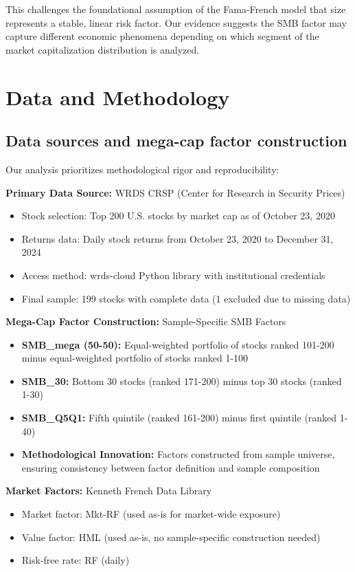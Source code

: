 \documentclass[10pt,letterpaper]{article}
\begin{document}
This challenges the foundational assumption of the Fama-French model that size represents a stable, linear risk factor. Our evidence suggests the SMB factor may capture different economic phenomena depending on which segment of the market capitalization distribution is analyzed.

\section*{Data and Methodology}

\subsection*{Data sources and mega-cap factor construction}

Our analysis prioritizes methodological rigor and reproducibility:

\textbf{Primary Data Source:} WRDS CRSP (Center for Research in Security Prices)
\begin{itemize}
\item Stock selection: Top 200 U.S. stocks by market cap as of October 23, 2020
\item Returns data: Daily stock returns from October 23, 2020 to December 31, 2024
\item Access method: wrds-cloud Python library with institutional credentials
\item Final sample: 199 stocks with complete data (1 excluded due to missing data)
\end{itemize}

\textbf{Mega-Cap Factor Construction:} Sample-Specific SMB Factors
\begin{itemize}
\item \textbf{SMB\_mega (50-50):} Equal-weighted portfolio of stocks ranked 101-200 minus equal-weighted portfolio of stocks ranked 1-100
\item \textbf{SMB\_30:} Bottom 30 stocks (ranked 171-200) minus top 30 stocks (ranked 1-30)
\item \textbf{SMB\_Q5Q1:} Fifth quintile (ranked 161-200) minus first quintile (ranked 1-40)
\item \textbf{Methodological Innovation:} Factors constructed from sample universe, ensuring consistency between factor definition and sample composition
\end{itemize}

\textbf{Market Factors:} Kenneth French Data Library
\begin{itemize}
\item Market factor: Mkt-RF (used as-is for market-wide exposure)
\item Value factor: HML (used as-is, no sample-specific construction needed)
\item Risk-free rate: RF (daily)
\end{itemize}
\end{document}
